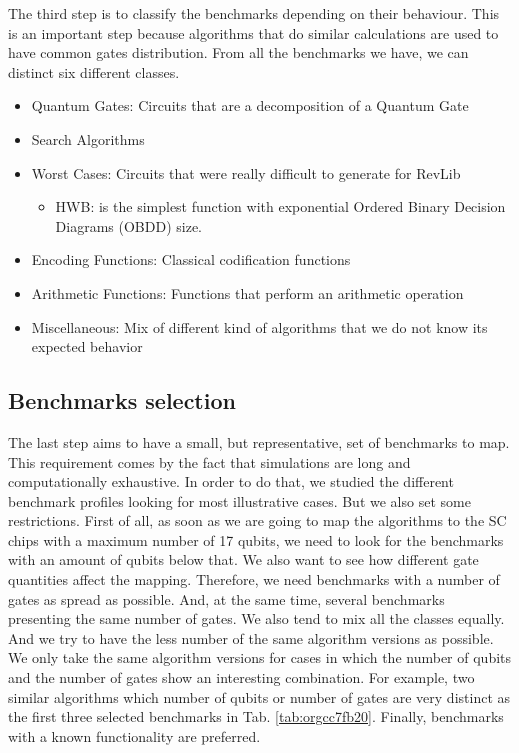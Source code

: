 The third step is to classify the benchmarks depending on their behaviour.
This is an important step because algorithms that do similar calculations are used to have common gates distribution.
From all the benchmarks we have, we can distinct six different classes.

\begin{itemize}
\item Quantum Gates: Circuits that are a decomposition of a Quantum Gate
\item Search Algorithms
\item Worst Cases: Circuits that were really difficult to generate for RevLib
\begin{itemize}
\item HWB: is the simplest function with exponential Ordered Binary Decision Diagrams (OBDD) size.
\end{itemize}
\item Encoding Functions: Classical codification functions
\item Arithmetic Functions: Functions that perform an arithmetic operation
\item Miscellaneous: Mix of different kind of algorithms that we do not know its expected behavior
\end{itemize}


\subsection*{Benchmarks selection}
\label{sec:org08793cd}

The last step aims to have a small, but representative, set of benchmarks to map.
This requirement comes by the fact that simulations are long and computationally exhaustive.
In order to do that, we studied the different benchmark profiles looking for most illustrative cases.
But we also set some restrictions.
First of all, as soon as we are going to map the algorithms to the SC chips with a maximum number of 17 qubits, we need to look for the benchmarks with an amount of qubits below that.
We also want to see how different gate quantities affect the mapping.
Therefore, we need benchmarks with a number of gates as spread as possible.
And, at the same time, several benchmarks presenting the same number of gates.
We also tend to mix all the classes equally.
And we try to have the less number of the same algorithm versions as possible.
We only take the same algorithm versions for cases in which the number of qubits and the number of gates show an interesting combination.
For example, two similar algorithms which number of qubits or number of gates are very distinct as the first three selected benchmarks in Tab. \ref{tab:orgcc7fb20}.
Finally, benchmarks with a known functionality are preferred.

